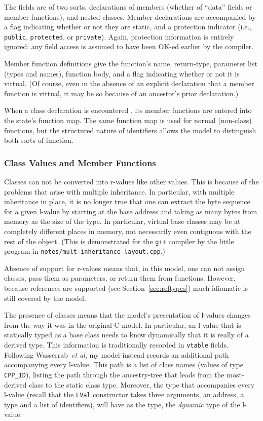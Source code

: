 \documentclass[11pt]{article}
\begin{document}
The fields are of two sorts, declarations of members (whether of
``data'' fields or member functions), and nested classes.  Member
declarations are accompanied by a flag indicating whether or not they
are static, and a protection indicator (i.e., \texttt{public},
\texttt{protected}, or \texttt{private}).  Again, protection
information is entirely ignored: any field access is assumed to have
been OK-ed earlier by the compiler.

Member function definitions give the function's name, return-type,
parameter list (types and names), function body, and a flag indicating
whether or not it is virtual.  (Of course, even in the absence of an
explicit declaration that a member function is virtual, it may be so
because of an ancestor's prior declaration.)

When a class declaration is encountered , its member functions are
entered into the state's function map.  The same function map is used
for normal (non-class) functions, but the structured nature of \cpp{}
identifiers allows the model to distinguish both sorts of function.

\subsubsection{Class Values and Member Functions}
\label{sec:class-values}
Classes can not be converted into r-values like other values.  This is
because of the problems that arise with multiple inheritance.  In
particular, with multiple inheritance in place, it is no longer true
that one can extract the byte sequence for a given l-value by starting
at the base address and taking as many bytes from memory as the size
of the type.  In particular, virtual base classes may be at completely
different places in memory, not necessarily even contiguous with the
rest of the object.  (This is demonstrated for the \texttt{g++}
compiler by the little program in
\texttt{notes/mult-inheritance-layout.cpp}.)

Absence of support for r-values means that, in this model, one can not
assign classes, pass them as parameters, or return them from
functions.  However, because references are supported (see
Section~\ref{sec:reftypes}) much idiomatic \cpp{} is still covered by
the model.

%
The presence of classes means that the model's presentation of
l-values changes from the way it was in the original C model.  In
particular, an l-value that is statically typed as a base class needs
to know dynamically that it is really of a derived type.  This
information is traditionally recorded in \texttt{vtable} fields.
Following Wasserrab~\emph{et al}, my model instead records an
additional path accompanying every l-value.  This path is a list of
class names (values of type \texttt{CPP_ID}), listing the path through the
ancestry-tree that leads from the most-derived class to the static
class type.  Moreover, the type that accompanies every l-value (recall
that the \texttt{LVal} constructor takes three arguments, an address,
a type and a list of identifiers), will have as the type, the
\emph{dynamic} type of the l-value.
\end{document}
